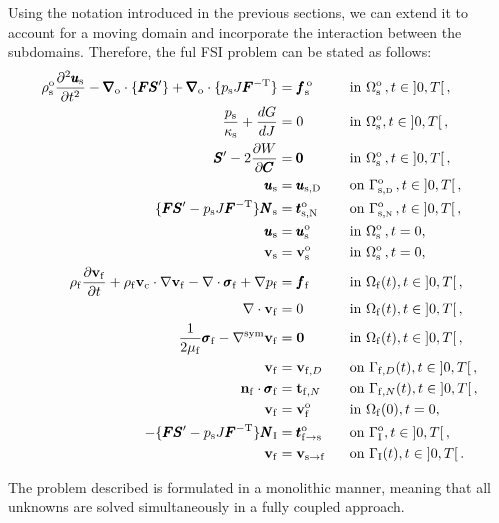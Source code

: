 \documentclass[11pt,english]{article}
\def\usolid{\pmb{u}_{\rm{s}}}                   %
\def\psolid{p_{\rm{s}}}                         %
\def\devPK{\pmb{S}^\prime}                      %
\def\F{\pmb{F}}                             %
\def\C{\pmb{C}}                             %
\def\invFtrans{\pmb{F}^{-\rm{T}}}           %
\def\dGdJ{\frac{dG}{dJ}}                    %
\def\dWdC{\frac{\partial W}{\partial \C}}   %
\def\vsolid{\vb{v}_{\rm{s}}}               %
\def\domainsolidreference{\Omega_{\rm{s}}^{\rm{o}}}  %
\def\boundarysolidDirichlet{\Gamma_{\rm{s,\scriptscriptstyle \rm{D}}}^{\rm{o}}} %
\def\boundarysolidNeumann{\Gamma_{\rm{s}, \scriptscriptstyle \rm{N}}^{\rm{o}}} %
\def\Normal{\pmb{N}_{\rm{s}}}                       %
\def\usolidDir{\pmb{u}_{\rm{s},\rm{D}}}                    %
\def\reftract{\pmb{t}_{\rm{s},\rm{N}}^{\rm{o}}}            %
\def\bodyfsolid{\pmb{f}_{\rm{s}}^{\,\rm{o}}}        %
\def\grad{\pmb{\nabla}_{\rm{o}}}        %
\def\div{\grad \cdot}                   %
\def\denssolid{\rho_{\rm{s}}^{\rm{o}}}  %
\def\kappasolid{\kappa_{\rm{s}}}        %
\def\alevelocity{\vb{v}_{\mathrm{c}}}
\def\densfluid{\rho_{\rm{f}}}                %
\def\viscfluid{\mu_{\rm{f}}}                 %
\def\domainfluid{\Omega_{\rm{f}}}
\def\boundaryfluidD{\Gamma_{\mathrm{f},D}}
\def\boundaryfluidN{\Gamma_{\mathrm{f},N}}
\def\vfluid{\vb{v}_{\rm{f}}}               %
\def\vfluidD{\vb{v}_{{\rm{f}},D}}
\def\pfluid{p_{\mathrm{f}}}                %
\def\bodyffluid{\pmb{f}_{\rm{f}}}          %
\def\tfluidN{\vb{t}_{\mathrm{f},N}}
\def\nfluid{\vb{n}_{\mathrm{f}}}
\def\sigmafluid{\pmb{\sigma}_{\rm{f}}}
\def\boundaryFSI{\Gamma_{\rm{I}}}
\def\boundaryFSIreference{\Gamma_{\rm{I}}^{\rm{o}}}
\def\FSItract{\pmb{t}_{\rm{f}\to{\rm{s}}}}
\def\FSItractref{\FSItract^{\rm{o}}}
\def\NormalFSI{\pmb{N}_{\rm{I}}}
\def\vboundaryFSI{\vb{v}_{\rm{s}\to{\rm{f}}}}
\def\timeint{\left ] 0,T\right[}                         %
\def\dudt{\frac{\partial \usolid}{\partial t}}          %
\def\dudt2{\frac{\partial^2 \usolid}{\partial t^2}}     %
\begin{document}
Using the notation introduced in the previous sections, we can extend it to account for a moving domain and incorporate the interaction between the subdomains. Therefore, the ful FSI problem can be stated as follows:
\begin{align}
 \denssolid \dudt2 - \div \lbrace \F \devPK \rbrace + \div \lbrace \psolid J \invFtrans \rbrace &= \bodyfsolid \quad && \hbox{in}~\domainsolidreference\,, t \in \timeint,  \\
 \frac{\psolid}{\kappasolid} + \dGdJ &= 0 \quad && \hbox{in}~\domainsolidreference, t \in \timeint, \\
 \devPK - 2\dWdC &= \pmb{0} \quad && \hbox{in}~\domainsolidreference\,, t \in \timeint, \\
 \usolid &= \usolidDir \quad && \hbox{on}~\boundarysolidDirichlet\,, t \in \timeint,\\
 \lbrace \F \devPK - \psolid J \invFtrans \rbrace \Normal &= \reftract \quad && \hbox{on}~\boundarysolidNeumann\,, t \in \timeint, \\
 \usolid &= \usolid^{\rm{o}} &&\hbox{in}~\domainsolidreference\,, t=0, \\
 \vsolid &= \vsolid^{\rm{o}} &&\hbox{in}~\domainsolidreference\,, t=0,\\
 \densfluid\frac{\partial \vfluid}{\partial t} + \densfluid \alevelocity \cdot \nabla \vfluid  - \nabla \cdot\sigmafluid+ \nabla \pfluid &= \bodyffluid \quad &&\hbox{in}~\domainfluid(t) , t \in \timeint, \\
    \nabla \cdot \vfluid &= 0 \quad &&\hbox{in}~\domainfluid(t) , t \in \timeint, \\
    \frac{1}{2\viscfluid}\sigmafluid-\nabla^{\rm sym}\vfluid
    &=\textbf{0} && \hbox{in}~\domainfluid(t), t \in \timeint, \\
    \vfluid&=\vfluidD  && \hbox{on} ~\boundaryfluidD(t), t \in \timeint, \\
    \nfluid \cdot \sigmafluid&=\tfluidN   && \hbox{on}~  \boundaryfluidN(t), t \in \timeint, \\
    \vfluid&= \vfluid^{\rm{o}} &&\hbox{in}~\domainfluid(0), t=0,\\
    -\lbrace \F \devPK - \psolid J \invFtrans \rbrace \NormalFSI &= \FSItractref \quad && \hbox{on}~\boundaryFSIreference, t \in \timeint, \label{eq:Solid_Interface}\\
    \vfluid&=\vboundaryFSI  && \hbox{on} ~\boundaryFSI(t), t \in \timeint .  
\end{align}

The problem described is formulated in a monolithic manner, meaning that all unknowns are solved simultaneously in a fully coupled approach. 
\end{document}
